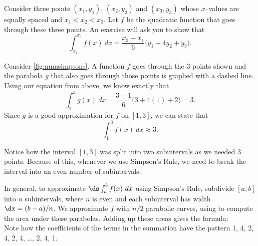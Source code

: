 Consider three points $(x_1,y_1)$, $(x_2,y_2)$ and $(x_3,y_3)$ whose $x$--values are equ\-ally spaced and $x_1<x_2<x_3$. Let $f$ be the quadratic function that goes through these three points. An exercise will ask you to show that 
\begin{equation}
\int_{x_1}^{x_3} f(x)\ dx = \frac{x_3-x_1}{6}\big(y_1+4y_2+y_3\big).\label{eq:simpsons}
\end{equation}


Consider \autoref{fig:numsimpsons}. A function $f$ goes through the 3 points shown and the parabola $g$ that also goes through those points is graphed with a dashed line. Using our equation from above, we know exactly that
\[\int_1^3 g(x) \ dx = \frac{3-1}{6}\big(3+4(1)+2\big)= 3.\]
Since $g$ is a good approximation for $f$ on $[1,3]$, we can state that
\[\int_1^3 f(x)\ dx \approx 3.\]

Notice how the interval $[1,3]$ was split into two subintervals as we needed 3 points. Because of this, whenever we use Simpson's Rule, we need to break the interval into an even number of subintervals. 

In general, to approximate $\ds \int_a^b f(x)\ dx$ using Simpson's Rule, subdivide $[a,b]$ into $n$ subintervals, where $n$ is even and each subinterval has width $\dx = (b-a)/n$. We approximate $f$ with $n/2$ parabolic curves, using  to compute the area under these parabolas. Adding up these areas gives the formula:
\\
Note how the coefficients of the terms in the summation have the pattern 1, 4, 2, 4, 2, 4, \ldots, 2, 4, 1.

